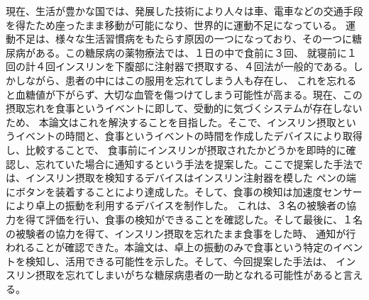 \begin{jabstract}

現在、生活が豊かな国では、発展した技術により人々は車、電車などの交通手段を得たため座ったまま移動が可能になり、世界的に運動不足になっている。
運動不足は、様々な生活習慣病をもたらす原因の一つになっており、その一つに糖尿病がある。この糖尿病の薬物療法では、１日の中で食前に３回、
就寝前に１回の計４回インスリンを下腹部に注射器で摂取する、４回法が一般的である。しかしながら、患者の中にはこの服用を忘れてしまう人も存在し、
これを忘れると血糖値が下がらず、大切な血管を傷つけてしまう可能性が高まる。現在、この摂取忘れを食事というイベントに即して、受動的に気づくシステムが存在しないため、
本論文はこれを解決することを目指した。そこで、インスリン摂取というイベントの時間と、食事というイベントの時間を作成したデバイスにより取得し、比較することで、
食事前にインスリンが摂取されたかどうかを即時的に確認し、忘れていた場合に通知するという手法を提案した。ここで提案した手法では、インスリン摂取を検知するデバイスはインスリン注射器を模した
ペンの端にボタンを装着することにより達成した。そして、食事の検知は加速度センサーにより卓上の振動を利用するデバイスを制作した。
これは、３名の被験者の協力を得て評価を行い、食事の検知ができることを確認した。そして最後に、１名の被験者の協力を得て、インスリン摂取を忘れたまま食事をした時、
通知が行われることが確認できた。本論文は、卓上の振動のみで食事という特定のイベントを検知し、活用できる可能性を示した。そして、今回提案した手法は、
インスリン摂取を忘れてしまいがちな糖尿病患者の一助となれる可能性があると言える。

\end{jabstract}

